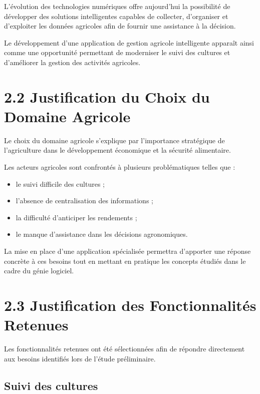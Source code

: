 \documentclass[12pt,a4paper]{report}
\begin{document}
L'évolution des technologies numériques offre aujourd'hui la possibilité
de développer des solutions intelligentes capables de collecter,
d'organiser et d'exploiter les données agricoles afin de fournir une
assistance à la décision.

Le développement d'une application de gestion agricole intelligente
apparaît ainsi comme une opportunité permettant de moderniser le suivi
des cultures et d'améliorer la gestion des activités agricoles.

\section{2.2 Justification du Choix du Domaine
Agricole}\label{justification-du-choix-du-domaine-agricole}

Le choix du domaine agricole s'explique par l'importance stratégique de
l'agriculture dans le développement économique et la sécurité
alimentaire.

Les acteurs agricoles sont confrontés à plusieurs problématiques telles
que :

\begin{itemize}
\item
  le suivi difficile des cultures ;
\item
  l'absence de centralisation des informations ;
\item
  la difficulté d'anticiper les rendements ;
\item
  le manque d'assistance dans les décisions agronomiques.
\end{itemize}

La mise en place d'une application spécialisée permettra d'apporter une
réponse concrète à ces besoins tout en mettant en pratique les concepts
étudiés dans le cadre du génie logiciel.

\section{2.3 Justification des Fonctionnalités
Retenues}\label{justification-des-fonctionnalituxe9s-retenues}

Les fonctionnalités retenues ont été sélectionnées afin de répondre
directement aux besoins identifiés lors de l'étude préliminaire.

\subsection{Suivi des cultures}\label{suivi-des-cultures}
\end{document}
